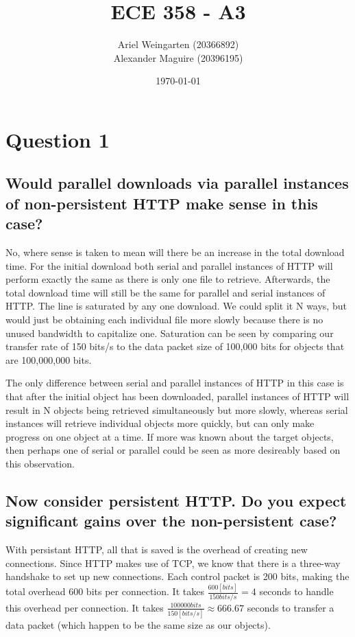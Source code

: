 \documentclass[a4paper]{article}
\title{ECE 358 - A3}
\author{Ariel Weingarten (20366892) \\
Alexander Maguire (20396195)}
\date{\today}
\begin{document}
\maketitle


\section{Question 1}

\subsection{Would parallel downloads via parallel instances of non-persistent HTTP make sense in this case?}
No, where sense is taken to mean will there be an increase in the total download time. For the initial download both serial and parallel instances of HTTP will perform exactly the same as there is only one file to retrieve. Afterwards, the total download time will still be the same for parallel and serial instances of HTTP. The line is saturated by any one download. We could split it N ways, but would just be obtaining each individual file more slowly because there is no unused bandwidth to capitalize one. Saturation can be seen by comparing our transfer rate of 150 bits/s to the data packet size of 100,000 bits for objects that are 100,000,000 bits. 

The only difference between serial and parallel instances of HTTP in this case is that after the initial object has been downloaded, parallel instances of HTTP will result in N objects being retrieved simultaneously but more slowly, whereas serial instances will retrieve individual objects more quickly, but can only make progress on one object at a time. If more was known about the target objects, then perhaps one of serial or parallel could be seen as more desireably based on this observation.

\subsection{Now consider persistent HTTP. Do you expect significant gains over the non-persistent case?}

With persistant HTTP, all that is saved is the overhead of creating new connections. Since HTTP makes use of TCP, we know that there is a three-way handshake to set up new connections. Each control packet is  200 bits, making the total overhead 600 bits per connection. It takes $\frac{\unit{600}[bits]}{150bits/s} = 4$ seconds to handle this overhead per connection. It takes $\frac{100000bits}{\unit{150}[bits/s]} \approx 666.67$ seconds to transfer a data packet (which happen to be the same size as our objects).  
\end{document}
